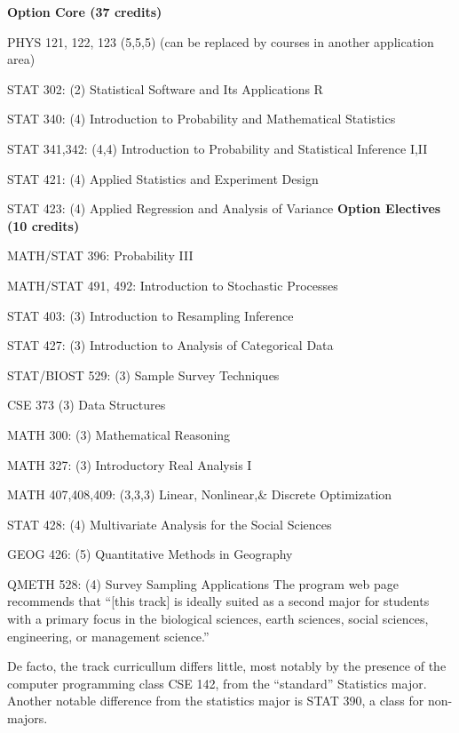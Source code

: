 {\bf Option Core (37 credits)}
\bit
    \item PHYS 121, 122, 123 (5,5,5) (can be replaced by courses in another application area)
    \item STAT 302: (2) Statistical Software and Its Applications R
    \item STAT 340: (4) Introduction to Probability and Mathematical Statistics
    \item STAT 341,342: (4,4) Introduction to Probability and Statistical Inference I,II
    \item STAT 421: (4) Applied Statistics and Experiment Design
    \item STAT 423: (4) Applied Regression and Analysis of Variance
\eit
{\bf Option Electives (10 credits)}
\bit
    \item MATH/STAT 396: Probability III
    \item MATH/STAT 491, 492: Introduction to Stochastic Processes
\item[]
    \item STAT 403: (3) Introduction to Resampling Inference
    \item STAT 427: (3) Introduction to Analysis of Categorical Data
    \item STAT/BIOST 529: (3) Sample Survey Techniques
\item[]
    \item CSE 373 (3) Data Structures
\item[]
    \item MATH 300: (3) Mathematical Reasoning
    \item MATH 327: (3) Introductory Real Analysis I
    \item MATH 407,408,409: (3,3,3) Linear, Nonlinear,\& Discrete Optimization
\item[]
    \item STAT 428: (4) Multivariate Analysis for the Social Sciences
    \item GEOG 426: (5) Quantitative Methods in Geography
    \item QMETH 528: (4) Survey Sampling Applications
\eit
The program web page recommends that ``[this track] is ideally suited as a second major for students with a primary focus in the biological sciences, earth sciences, social sciences, engineering, or management science.''

De facto, the track curricullum differs little, most notably by the
presence of the computer programming class CSE 142, from the
``standard'' Statistics major. Another notable difference from the
statistics major is STAT 390, a class for non-majors. 

